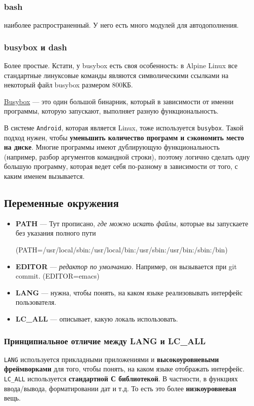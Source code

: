 \subsubsection{bash} наиболее распространенный. У него есть много модулей для автодополнения.

\subsubsection{busybox и dash} Более простые. Кстати, у busybox есть своя особенность: в Alpine Linux все стандартные линуксовые команды являются символическими ссылками на некоторый файл busybox размером 800КБ. 

\begin{Def}
	\underline{Busybox} --- это один большой бинарник, который в зависимости от именни программы, которую запускают, выполняет разную функциональность.
\end{Def}

В системе \texttt{Android}, которая является Linux, тоже используется \texttt{busybox}. Такой подход нужен, чтобы \textbf{уменьшить количество программ и сэкономить место на диске}. Многие программы имеют дублирующую функциональность (например, разбор аргументов командной строки), поэтому логично сделать одну большую программу, которая ведет себя по-разному в зависимости от того, с каким именем вызывается.

\subsection{Переменные окружения}

\begin{itemize}
  \item \textbf{PATH} --- Тут прописано, \textit{где можно искать файлы}, которые вы запускаете без указания полного пути 
 
(PATH=/usr/local/sbin:/usr/local/bin:/usr/sbin:/usr/bin:/sbin:/bin)
  \item \textbf{EDITOR} --- \textit{редактор по умолчанию.} Например, он вызывается при git commit. (EDITOR=emacs)
  \item \textbf{LANG} --- нужна, чтобы понять, на каком языке реализовывать интерфейс пользователя.
  \item \textbf{LC\_ALL} --- описывает, какую локаль использовать.
\end{itemize}


\subsubsection{Принципиальное отличие между LANG и LC\_ALL} \texttt{LANG} используется прикладными приложениями и \textbf{высокоуровневыми фреймворками} для того, чтобы понять, на каком языке отображать интерфейс. \texttt{LC\_ALL} используется \textbf{стандартной С библиотекой}. В частности, в функциях ввода/вывода, форматировании дат и т.д. То есть это более \textbf{низкоуровневая} вещь.


